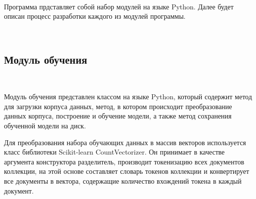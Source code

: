 \

Программа прдставляет собой набор модулей на языке Python. Далее будет описан процесс разработки каждого из модулей программы.

\

\subsection{Модуль обучения}
\

Модуль обучения представлен классом на языке Python, который содержит метод для загрузки корпуса данных, метод, в котором происходит преобразование данных корпуса, построение и обучение модели, а также метод сохранения обученной модели на диск.

Для преобразования набора обучающих данных в массив векторов используется класс библиотеки Scikit-learn CountVectorizer. Он принимает в качестве аргумента конструктора разделитель, производит токенизацию всех документов коллекции, на этой основе составляет словарь токенов коллекции и конвертирует все документы в вектора, содержащие количество вхождений токена в каждый документ\cite{Scikit}.

\newpage